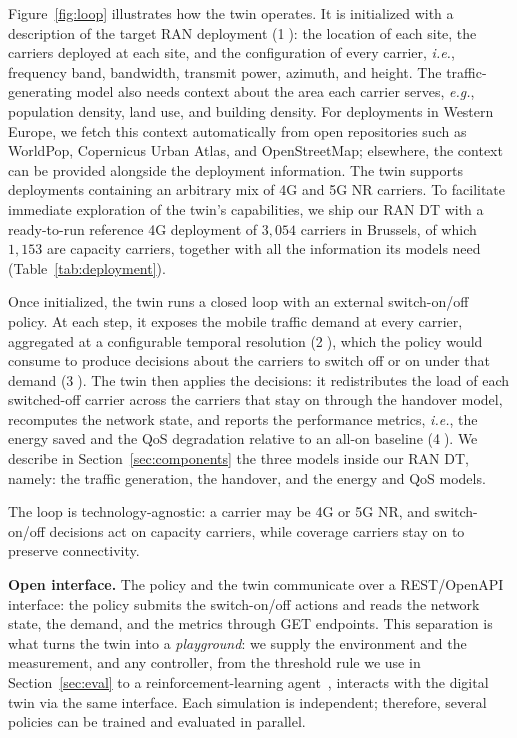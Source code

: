 \documentclass[sigconf, 10pt]{acmart}
\newcommand{\circled}[1]{\textcircled{\footnotesize #1}}  %
\newcommand{\eg}{\textit{e.g.},\xspace}
\newcommand{\ie}{\textit{i.e.},\xspace}
\begin{document}
Figure~\ref{fig:loop} illustrates how the twin operates. 
It is initialized with a description of the target \ac{RAN} deployment (\circled{1}): the location of each site, the carriers deployed at each site, and the configuration of every carrier, \ie frequency band, bandwidth, transmit power, azimuth, and height. 
The traffic-generating model also needs context about the area each carrier serves, \eg population density, land use, and building density. 
For deployments in Western Europe, we fetch this context automatically from open repositories such as WorldPop, Copernicus Urban Atlas, and OpenStreetMap; elsewhere, the context can be provided alongside the deployment information. 
The twin supports deployments containing an arbitrary mix of 4G and 5G NR carriers. To facilitate immediate exploration of the twin's capabilities, we ship our \ac{RAN} \ac{DT} with a ready-to-run reference 4G deployment of $3{,}054$ carriers in Brussels, of which $1{,}153$ are capacity carriers, together with all the information its models need (Table~\ref{tab:deployment}). 

Once initialized, the twin runs a closed loop with an external switch-on/off policy. At each step, it exposes the mobile traffic demand at every carrier, aggregated at a configurable temporal resolution (\circled{2}), which the policy would consume to produce decisions about the carriers to switch off or on under that demand (\circled{3}). 
The twin then applies the decisions: it redistributes the load of each switched-off carrier across the carriers that stay on through the handover model, recomputes the network state, and reports the performance metrics, \ie the energy saved and the \ac{QoS} degradation relative to an all-on baseline (\circled{4}). 
We describe in Section~\ref{sec:components} the three models inside our \ac{RAN} \ac{DT}, namely: the traffic generation, the handover, and the energy and \ac{QoS} models.

The loop is technology-agnostic: a carrier may be 4G or 5G NR, and switch-on/off decisions act on capacity carriers, while coverage carriers stay on to preserve connectivity.
\vspace*{0.3em}

\noindent\textbf{Open interface.} 
The policy and the twin communicate over a REST/OpenAPI interface: the policy submits the switch-on/off actions and reads the network state, the demand, and the metrics through GET endpoints. 
This separation is what turns the twin into a \textit{playground}: we supply the environment and the measurement, and any controller, from the threshold rule we use in Section~\ref{sec:eval} to a reinforcement-learning agent~\cite{rl2021}, interacts with the digital twin via the same interface. 
Each simulation is independent; therefore, several policies can be trained and evaluated in parallel.
\end{document}

